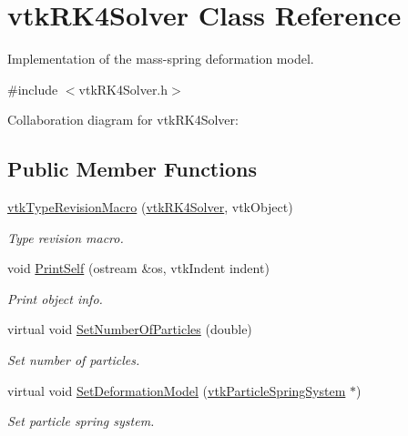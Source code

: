 \hypertarget{classvtkRK4Solver}{
\section{vtkRK4Solver Class Reference}
\label{classvtkRK4Solver}
}


Implementation of the mass-\/spring deformation model.  




{\ttfamily \#include $<$vtkRK4Solver.h$>$}



Collaboration diagram for vtkRK4Solver:\subsection*{Public Member Functions}
\begin{DoxyCompactItemize}
\item 
\hypertarget{classvtkRK4Solver_aad3829aa081fa1d2f43f2759250b2040}{
\hyperlink{classvtkRK4Solver_aad3829aa081fa1d2f43f2759250b2040}{vtkTypeRevisionMacro} (\hyperlink{classvtkRK4Solver}{vtkRK4Solver}, vtkObject)}
\label{classvtkRK4Solver_aad3829aa081fa1d2f43f2759250b2040}

\begin{DoxyCompactList}\small\item\em Type revision macro. \item\end{DoxyCompactList}\item 
\hypertarget{classvtkRK4Solver_a09f3d9a2f8acbf80a93791f6ac332064}{
void \hyperlink{classvtkRK4Solver_a09f3d9a2f8acbf80a93791f6ac332064}{PrintSelf} (ostream \&os, vtkIndent indent)}
\label{classvtkRK4Solver_a09f3d9a2f8acbf80a93791f6ac332064}

\begin{DoxyCompactList}\small\item\em Print object info. \item\end{DoxyCompactList}\item 
\hypertarget{classvtkRK4Solver_a389ca4e65f8c45bfa41f950bd9dbb778}{
virtual void \hyperlink{classvtkRK4Solver_a389ca4e65f8c45bfa41f950bd9dbb778}{SetNumberOfParticles} (double)}
\label{classvtkRK4Solver_a389ca4e65f8c45bfa41f950bd9dbb778}

\begin{DoxyCompactList}\small\item\em Set number of particles. \item\end{DoxyCompactList}\item 
\hypertarget{classvtkRK4Solver_a9e9fa5e9fb17f8bf974cd34c48fcc300}{
virtual void \hyperlink{classvtkRK4Solver_a9e9fa5e9fb17f8bf974cd34c48fcc300}{SetDeformationModel} (\hyperlink{classvtkParticleSpringSystem}{vtkParticleSpringSystem} $\ast$)}
\label{classvtkRK4Solver_a9e9fa5e9fb17f8bf974cd34c48fcc300}

\begin{DoxyCompactList}\small\item\em Set particle spring system. \item\end{DoxyCompactList}\end{DoxyCompactItemize}
